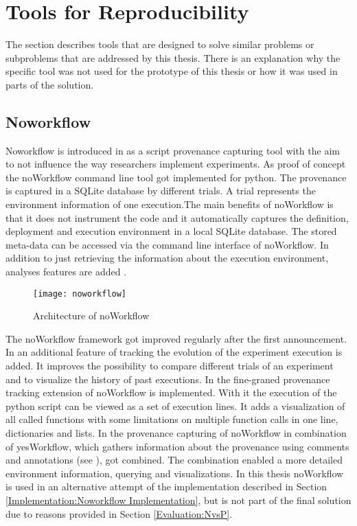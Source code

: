 \documentclass[draft,final]{vutinfth} %
\begin{document}
\section{Tools for Reproducibility}\label{Existing Tools}
The section describes tools that are designed to solve similar problems or subproblems that are addressed by this thesis. There is an explanation why the specific tool was not used for the prototype of this thesis or how it was used in parts of the solution. 

\subsection{Noworkflow}\label{Noworkflow}
Noworkflow is introduced in \cite{c9e0604becba42af96a9cb0a6f60018b} as a script provenance capturing tool with the aim to not influence the way researchers implement experiments. As proof of concept the noWorkflow command line tool got implemented for python. The provenance is captured in a SQLite database by different trials. A trial represents the environment information of one execution.The main benefits of noWorkflow is that it does not instrument the code and it automatically captures the definition, deployment and execution environment in a local SQLite database. The stored meta-data can be accessed via the command line interface of noWorkflow. In addition to just retrieving the information about the execution environment, analyses features are added \cite{c9e0604becba42af96a9cb0a6f60018b}.

\begin{figure}[h]
	\centering
	\texttt{[image: noworkflow]}
	\caption{Architecture of noWorkflow \cite{c9e0604becba42af96a9cb0a6f60018b}}
	\label{fig:noworkflow} %
\end{figure}

The noWorkflow framework got improved regularly after the first announcement. In \cite{Pimentel2016TrackingAA} an additional feature of tracking the evolution of the experiment execution is added. It improves the possibility to compare different trials of an experiment and to visualize the history of past executions. In \cite{Pimentel:2016:FPC:3090188.3090214} the fine-graned provenance tracking extension of noWorkflow is implemented. With it the execution of the python script can be viewed as a set of execution lines. It adds a visualization of all called functions with some limitations on multiple function calls in one line, dictionaries and lists. In \cite{69bac1252a684629baa43b48e350068d} the provenance capturing of noWorkflow in combination of yesWorkflow, which gathers information about the provenance using comments and annotations (see \cite{192094}), got combined. The combination enabled a more detailed environment information, querying and visualizations. 
In this thesis noWorkflow is used in an alternative attempt of the implementation described in Section \ref{Implementation:Noworkflow Implementation}, but is not part of the final solution due to reasons provided in Section \ref{Evaluation:NvsP}.
\end{document}
